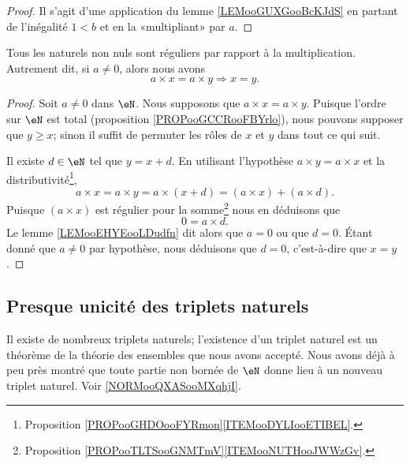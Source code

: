 \begin{proof}
    Il s'agit d'une application du lemme \ref{LEMooGUXGooBcKJdS} en partant de l'inégalité \( 1<b\) et en la «multipliant» par \( a\).
\end{proof}

\begin{proposition}
    Tous les naturels non nuls sont réguliers par rapport à la multiplication. Autrement dit, si \( a\neq 0\), alors nous avons
    \begin{equation}
        a\times x=a\times y\Rightarrow x=y.
    \end{equation}
\end{proposition}

\begin{proof}
    Soit \( a\neq 0\) dans \( \eN\). Nous supposons que \( a\times x=a\times y\). Puisque l'ordre sur \( \eN\) est total (proposition \ref{PROPooGCCRooFBYrlo}), nous pouvons supposer que \( y\geq x\); sinon il suffit de permuter les rôles de \( x\) et \( y\) dans tout ce qui suit.

    Il existe \( d\in \eN\) tel que \( y=x+d\). En utilisant l'hypothèse \( a\times y=a\times x\) et la distributivité\footnote{Proposition \ref{PROPooGHDOooFYRmon}\ref{ITEMooDYLIooETIBEL}.}, 
    \begin{equation}
        a\times x=a\times y=a\times (x+d)=(a\times x)+(a\times d).
    \end{equation}
    Puisque \( (a\times x)\) est régulier pour la somme\footnote{Proposition \ref{PROPooTLTSooGNMTmV}\ref{ITEMooNUTHooJWWzGv}.} nous en déduisons que
    \begin{equation}
        0=a\times d.
    \end{equation}
    Le lemme \ref{LEMooEHYEooLDudfn} dit alors que \( a=0\) ou que \( d=0\). Étant donné que \( a\neq 0\) par hypothèse, nous déduisons que \( d=0\), c'est-à-dire que \( x=y\).
\end{proof}

\subsection{Presque unicité des triplets naturels}

Il existe de nombreux triplets naturels; l'existence d'un triplet naturel est un théorème de la théorie des ensembles que nous avons accepté. Nous avons déjà à peu près montré que toute partie non bornée de \( \eN\) donne lieu à un nouveau triplet naturel. Voir \ref{NORMooQXASooMXqhjI}.

